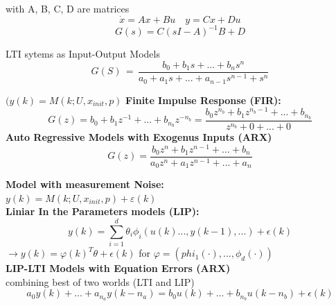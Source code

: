 \begin{tcolorbox}[colback=green!5!white,colframe=green!75!black,title=Linear Time Invariant (LTI) Systems]
with A, B, C, D are matrices
\begin{equation*}
\dot { x } =Ax+Bu \quad y=Cx+Du 
\end{equation*}
\begin{equation*}
G(s)=C{ (sI-A) }^{ -1 }B+D
\end{equation*}

LTI sytems as Input-Output Models
\begin{equation*}
G(S)\, =\, \frac { b_0 + b_1s+...+b_ns^n }{ a_0+a_1s+...+a_{n-1}s^{n-1}+s^n } 
\end{equation*}
\end{tcolorbox}

\begin{tcolorbox}[colback=green!5!white,colframe=green!75!black,title=Deterministic Models:]
$(y(k)=M(k;U,{ x }_{ init },p)$
\textbf{Finite Impulse Response (FIR):}
\begin{equation*}
G(z) = b_0 + b_1z^{-1} + ... + b_{n_b}z^{-n_b} = \frac{b_0z^{n_b} + b_1z^{n_b-1} + ... + b_{n_{b}}}{z^{n_b}+0+...+0}
\end{equation*}
\textbf{Auto Regressive Models with Exogenus Inputs (ARX)}
\begin{equation*}
G(z) = \frac{b_0z^n + b_1z^{n-1} + ... + b_n}{a_0z^n + a_1z^{n-1} + ... + a_n}
\end{equation*}
\end{tcolorbox}

\begin{tcolorbox}[colback=green!5!white,colframe=green!75!black,title=Stochastik Models]
\textbf{Model with measurement Noise:} \\ \(y(k)=M(k;U,{ x }_{ init },p)+\varepsilon(k)\) \\
\textbf{Liniar In the Parameters models (LIP):}
\begin{equation*}
y(k) = \sum_{i= 1}^{d}\theta_i\phi_i(u(k)...,y(k-1),...)+\epsilon(k)
\end{equation*}
$\rightarrow y(k) = \varphi(k)^T\theta + \epsilon(k)$ for $\varphi = (phi_1(\cdot),...,\phi_d(\cdot))$ \\
\textbf{LIP-LTI Models with Equation Errors (ARX)}\\
combining best of two worlds (LTI and LIP)
\begin{equation*}
a_0y(k)+...+a_{n_{a}}y(k-n_a) = b_0u(k)+...+b_{n_{b}}u(k-n_b)+\epsilon(k)
\end{equation*}
\end{tcolorbox}

